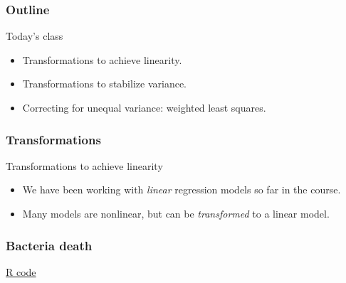 \documentclass[handout]{beamer}
\begin{document}

   \begin{frame} \frametitle{Outline}

   \begin{block}{Today's class}

   \begin{itemize}

   \item Transformations to achieve linearity.

   \item Transformations to stabilize variance.
   \item Correcting for unequal variance: weighted least squares.
   \end{itemize}

   \end{block}
   \end{frame}


   \begin{frame} \frametitle{Transformations}

   \begin{block}
   {Transformations to achieve linearity                     }
   \begin{itemize}


   \item We have been working with {\em linear} regression models so far in the course.

   \item Many models are nonlinear, but can be {\em transformed} to a linear model.



   \end{itemize}

   \end{block}
   \end{frame}



   \begin{frame}
   \frametitle{Bacteria death}
   \begin{center}
   \end{center}
   \href{http://stats191.stanford.edu/transformations.html#bacteria-example}{R code}
   \end{frame}
\end{document}
